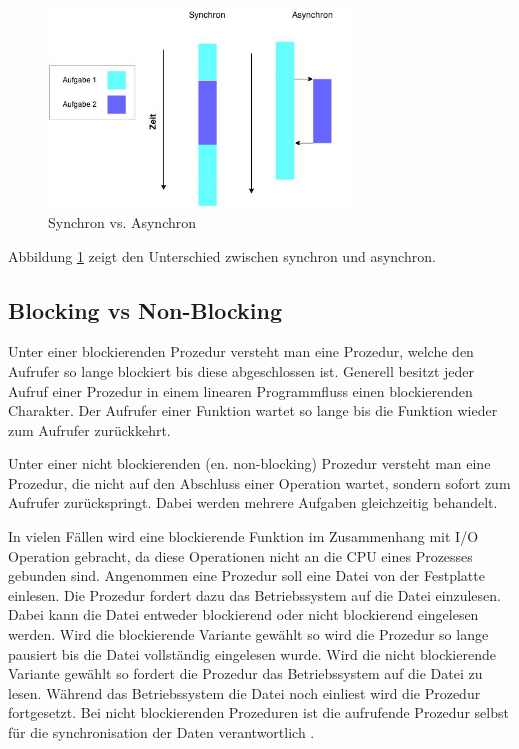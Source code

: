 \begin{figure}[!htb]
  \centering
  \includegraphics[width=8cm]{images/synchron_vs_asynchron.jpg}
  \caption{
    Synchron vs. Asynchron
  }
  \label{figure:syncron_vs_async}
\end{figure}

Abbildung \ref{figure:syncron_vs_async} zeigt den Unterschied zwischen synchron und asynchron. 

\subsection{Blocking vs Non-Blocking}

Unter einer blockierenden Prozedur versteht man eine Prozedur, welche den Aufrufer so lange blockiert bis diese abgeschlossen ist. Generell besitzt jeder Aufruf einer Prozedur in einem linearen Programmfluss einen blockierenden Charakter. Der Aufrufer einer Funktion wartet so lange bis die Funktion wieder zum Aufrufer zurückkehrt. 

Unter einer nicht blockierenden (en. non-blocking) Prozedur versteht man eine Prozedur, die nicht auf den Abschluss einer Operation wartet, sondern sofort zum Aufrufer zurückspringt. Dabei werden mehrere Aufgaben gleichzeitig behandelt.  

In vielen Fällen wird eine blockierende Funktion im Zusammenhang mit I/O Operation gebracht, da diese Operationen nicht an die CPU eines Prozesses gebunden sind. Angenommen eine Prozedur soll eine Datei von der Festplatte einlesen. Die Prozedur fordert dazu das Betriebssystem auf die Datei einzulesen. Dabei kann die Datei entweder blockierend oder nicht blockierend eingelesen werden. Wird die blockierende Variante gewählt so wird die Prozedur so lange pausiert bis die Datei vollständig eingelesen wurde. Wird die nicht blockierende Variante gewählt so fordert die Prozedur das Betriebssystem auf die Datei zu lesen. Während das Betriebssystem die Datei noch einliest wird die Prozedur fortgesetzt. Bei nicht blockierenden Prozeduren ist die aufrufende Prozedur selbst für die synchronisation der Daten verantwortlich \cite[p. 47]{Erb2012}.

